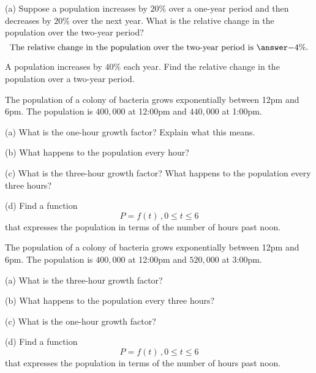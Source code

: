 \documentclass{ximera}
\begin{document}
\begin{question}  \label{Q2:ExponentialG}
(a) Suppose a population increases by $20\%$ over a one-year period and then decreases by $20\%$ over the next year. What is the relative change in the population over the two-year period?
\[
   \text{The relative change in the population over the two-year period is }   \answer{-4\%} .
\]

\end{question}

\begin{question}  \label{Q3:ExponentialG}
A population increases by $40\%$ each year. Find the relative change in the population over a two-year period. 
\begin{multipleChoice}  
\end{multipleChoice}  
\end{question}


\begin{question}   \label{Q4:ExponentialG}
The population of a colony of bacteria grows exponentially between 12pm and 6pm. The population is $400,000$ at 12:00pm and $440,000$ at 1:00pm. 

(a) What is the one-hour growth factor? Explain what this means.

(b) What happens to the population every hour?

(c) What is the three-hour growth factor? What happens to the population every three hours?

(d) Find a function 
\[
     P = f(t) \, , 0\leq t \leq 6 
\]
that expresses the population in terms of the number of hours past noon.

\end{question}


\begin{question}   \label{Q5:ExponentialG}
The population of a colony of bacteria grows exponentially between 12pm and 6pm. The population is $400,000$ at 12:00pm and $520,000$ at 3:00pm. 

(a) What is the three-hour growth factor?

(b) What happens to the population every three hours?

(c) What is the one-hour growth factor?

(d) Find a function 
\[
     P = f(t) \, , 0\leq t \leq 6 
\]
that expresses the population in terms of the number of hours past noon.

\end{question}
\end{document}
